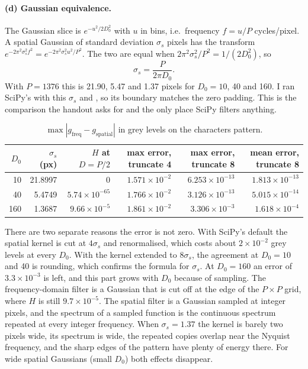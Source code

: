 \paragraph{(d) Gaussian equivalence.} The Gaussian slice is
$e^{-u^2/2D_0^2}$ with $u$ in bins, i.e.\ frequency $f=u/P$ cycles/pixel. A
spatial Gaussian of standard deviation $\sigma_s$ pixels has the transform
$e^{-2\pi^2\sigma_s^2f^2}=e^{-2\pi^2\sigma_s^2u^2/P^2}$. The two are equal when
$2\pi^2\sigma_s^2/P^2=1/(2D_0^2)$, so
\begin{equation}
\sigma_s=\frac{P}{2\pi D_0}.
\end{equation}
With $P=1376$ this is 21.90, 5.47 and 1.37 pixels for $D_0=10$, 40 and 160. I
ran SciPy's  with this $\sigma_s$ and
, so its boundary matches the zero padding. This is the
comparison the handout asks for and the only place SciPy filters anything.

\begin{table}[H]
\centering
\begin{tabular}{rrrrrr}
\toprule
$D_0$ & $\sigma_s$ (px) & $H$ at $D=P/2$ & max error, truncate 4 & max error, truncate 8 & mean error, truncate 8\\
\midrule
10 & 21.8997 & 0 & $1.571\times10^{-2}$ & $6.253\times10^{-13}$ & $1.813\times10^{-13}$\\
40 & 5.4749 & $5.74\times10^{-65}$ & $1.766\times10^{-2}$ & $3.126\times10^{-13}$ & $5.015\times10^{-14}$\\
160 & 1.3687 & $9.66\times10^{-5}$ & $1.861\times10^{-2}$ & $3.306\times10^{-3}$ & $1.618\times10^{-4}$\\
\bottomrule
\end{tabular}
\caption{$\max|g_\text{freq}-g_\text{spatial}|$ in grey levels on the
characters pattern.}
\label{tab:gauss-eq}
\end{table}

There are two separate reasons the error is not zero. With SciPy's default
 the spatial kernel is cut at $4\sigma_s$ and renormalised,
which costs about $2\times10^{-2}$ grey levels at every $D_0$. With the kernel
extended to $8\sigma_s$, the agreement at $D_0=10$ and 40 is rounding, which
confirms the formula for $\sigma_s$. At $D_0=160$ an error of
$3.3\times10^{-3}$ is left, and this part grows with $D_0$ because of sampling.
The frequency-domain filter is a Gaussian that is cut off at the edge of the
$P\times P$ grid, where $H$ is still $9.7\times10^{-5}$. The spatial filter is a
Gaussian sampled at integer pixels, and the spectrum of a sampled function is
the continuous spectrum repeated at every integer frequency. When
$\sigma_s=1.37$ the kernel is barely two pixels wide, its spectrum is wide, the
repeated copies overlap near the Nyquist frequency, and the sharp edges of the
pattern have plenty of energy there. For wide spatial Gaussians (small $D_0$)
both effects disappear.

